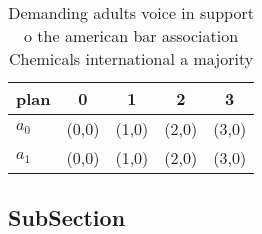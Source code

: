 \documentclass[a4paper]{article}
\begin{document}
\begin{table}
\begin{adjustbox}{width=0.5\columnwidth}
\begin{tabular}{|l|l|l|l|l|}
\hline
\textbf{plan} & \multicolumn{1}{c|}{\textbf{0}} & \multicolumn{1}{c|}{\textbf{1}} & \multicolumn{1}{c|}{\textbf{2}} & \multicolumn{1}{c|}{\textbf{3}} \\ \hline
\textbf{$a_0$}  & (0,0) & (1,0) & (2,0) & (3,0) \\ \hline
\textbf{$a_1$}  & (0,0) & (1,0) & (2,0) & (3,0) \\ \hline
\end{tabular}
\end{adjustbox}
\caption{Demanding adults voice in support o the american bar association Chemicals international a majority
}
\end{table}

\subsection{SubSection}
\end{document}

